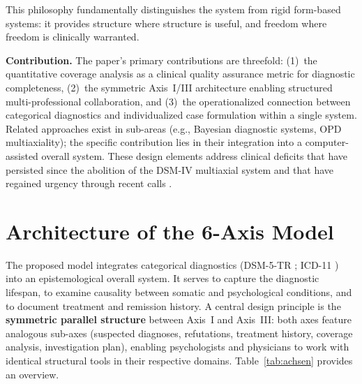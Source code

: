 \documentclass[11pt,a4paper]{article}
\begin{document}
This philosophy fundamentally distinguishes the system from rigid form-based systems: it provides structure where structure is useful, and freedom where freedom is clinically warranted.

\textbf{Contribution.} The paper's primary contributions are threefold: (1)~the quantitative coverage analysis as a clinical quality assurance metric for diagnostic completeness, (2)~the symmetric Axis~I/III architecture enabling structured multi-professional collaboration, and (3)~the operationalized connection between categorical diagnostics and individualized case formulation within a single system. Related approaches exist in sub-areas (e.g., Bayesian diagnostic systems, OPD multiaxiality); the specific contribution lies in their integration into a computer-assisted overall system. These design elements address clinical deficits that have persisted since the abolition of the DSM-IV multiaxial system and that have regained urgency through recent calls \citep{ErlichFirst2025}.


\section{Architecture of the 6-Axis Model}
\label{sec:model}

The proposed model integrates categorical diagnostics (DSM-5-TR \citep{APA2022}; ICD-11 \citep{WHO2019}) into an epistemological overall system. It serves to capture the diagnostic lifespan, to examine causality between somatic and psychological conditions, and to document treatment and remission history. A central design principle is the \textbf{symmetric parallel structure} between Axis~I and Axis~III: both axes feature analogous sub-axes (suspected diagnoses, refutations, treatment history, coverage analysis, investigation plan), enabling psychologists and physicians to work with identical structural tools in their respective domains. Table~\ref{tab:achsen} provides an overview.
\end{document}
